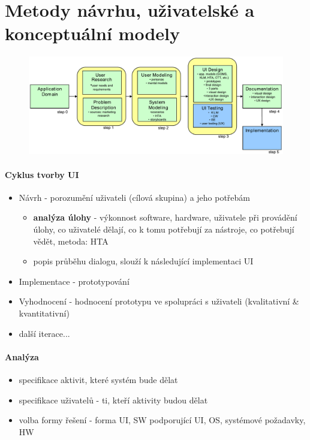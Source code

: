 \section[NUR - Metody návrhu, uživatelské a konceptuální modely]{Metody návrhu, uživatelské a konceptuální modely}

\begin{figure}[h!]
\centering
\includegraphics[width=125mm]{04/images/hci}
\end{figure}

\paragraph{Cyklus tvorby UI}
\begin{itemize}[itemsep=0px]
\item Návrh - porozumění uživateli (cílová skupina) a jeho potřebám
\begin{itemize}[itemsep=0px]
\item \textbf{analýza úlohy} - výkonnost software, hardware, uživatele při provádění úlohy, co uživatelé dělají, co k tomu potřebují za nástroje, co potřebují vědět, metoda: HTA
\item popis průběhu dialogu, slouží k následující implementaci UI
\end{itemize}
\item Implementace - prototypování
\item Vyhodnocení - hodnocení prototypu ve spolupráci s uživateli (kvalitativní \&
kvantitativní)
\item další iterace...
\end{itemize}

\paragraph{Analýza}
\begin{itemize}[itemsep=0px]
\item specifikace aktivit, které systém bude dělat
\item specifikace uživatelů - ti, kteří aktivity budou dělat
\item volba formy řešení - forma UI, SW podporující UI, OS, systémové požadavky, HW
\end{itemize}

